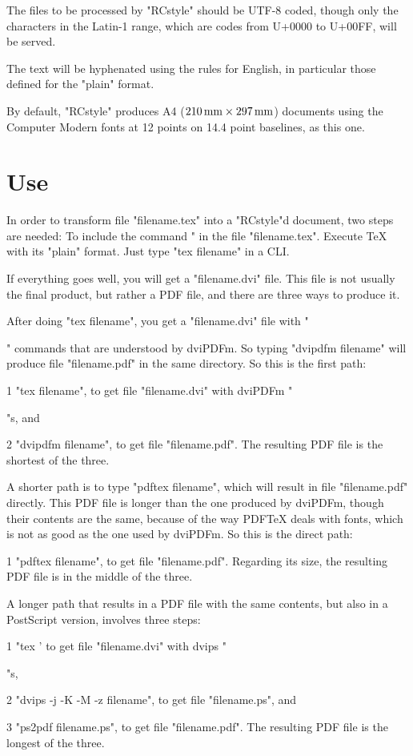 The files to be processed by "RCstyle" should be
UTF-8 coded, though only the characters in the Latin-1 range,
which are codes from U+0000 to U+00FF,
will be served.

The text will be hyphenated using the rules for English,
in particular those defined for the "plain" format.

By default, "RCstyle" produces
 A4 ($210\,\hbox{mm}\times297\,\hbox{mm}$) documents
using the Computer Modern fonts
at 12 points on 14.4 point baselines,
as this one.


\section{Use}

In order to transform file "filename.tex"
into a "RCstyle"d document,
two steps are needed:
\beginpoints
\point To include the command "
       in the file "filename.tex".
\point Execute {\TeX} with its "plain" format.
       Just type "tex filename" in a CLI.
\endpoints

If everything goes well, you will get a "filename.dvi" file.
This file is not usually the final product,
but rather a PDF file, and there are three ways to produce it.

After doing "tex filename", you get a "filename.dvi" file
with "\special" commands that are understood by dviPDFm.
So typing "dvipdfm filename" will produce file
"filename.pdf" in the same directory.
So this is the first path:
\beginpoints
\item{1} "tex filename",
 to get file "filename.dvi" with dviPDFm "\special"s, and
\item{2} "dvipdfm filename",
 to get file "filename.pdf".
\endpoints
The resulting PDF file is the shortest of the three.

A shorter path is to type "pdftex filename",
which will result in file "filename.pdf" directly.
This PDF file is longer than the one produced by dviPDFm,
though their contents are the same,
because of the way PDF{\TeX} deals with fonts,
which is not as good as the one used by dviPDFm.
So this is the direct path:
\beginpoints
\item{1} "pdftex filename",
 to get file "filename.pdf".
\endpoints
Regarding its size,
the resulting PDF file is in the middle of the three.

A longer path that results in a PDF file with the same
contents, but also in a PostScript version, involves three steps:
\beginpoints
\item{1} "tex '\let\dvips\relax 
 to get file "filename.dvi" with dvips "\special"s,
\item{2} "dvips -j -K -M -z filename",
 to get file "filename.ps", and
\item{3} "ps2pdf filename.ps",
 to get file "filename.pdf".
\endpoints
The resulting PDF file is the longest of the three.


